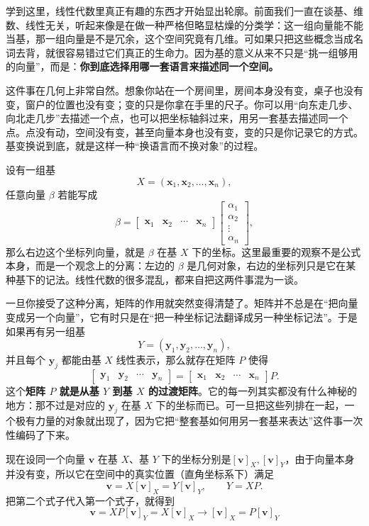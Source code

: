 \documentclass[UTF8]{ctexbook}
\begin{document}
学到这里，线性代数里真正有趣的东西才开始显出轮廓。前面我们一直在谈基、维数、线性无关，听起来像是在做一种严格但略显枯燥的分类学：这一组向量能不能当基，那一组向量是不是冗余，这个空间究竟有几维。可如果只把这些概念当成名词去背，就很容易错过它们真正的生命力。因为基的意义从来不只是“挑一组够用的向量”，而是：\textbf{你到底选择用哪一套语言来描述同一个空间。}

这件事在几何上非常自然。想象你站在一个房间里，房间本身没有变，桌子也没有变，窗户的位置也没有变；变的只是你拿在手里的尺子。你可以用“向东走几步、向北走几步”去描述一个点，也可以把坐标轴斜过来，用另一套基去描述同一个点。点没有动，空间没有变，甚至向量本身也没有变，变的只是你记录它的方式。基变换说到底，就是这样一种“换语言而不换对象”的过程。

设有一组基
\[
X=(\mathbf{x}_1,\mathbf{x}_2,\dots,\mathbf{x}_n),
\]
任意向量 $\beta$ 若能写成
\[
\beta
=\begin{bmatrix}\mathbf{x}_1 & \mathbf{x}_2 & \cdots & \mathbf{x}_n\end{bmatrix}
\begin{bmatrix}\alpha_1 \\ \alpha_2 \\ \vdots \\ \alpha_n\end{bmatrix},
\]
那么右边这个坐标列向量，就是 $\beta$ 在基 $X$ 下的坐标。这里最重要的观察不是公式本身，而是一个观念上的分离：左边的 $\beta$ 是几何对象，右边的坐标列只是它在某种基下的记法。线性代数的很多混乱，都来自把这两件事混为一谈。

一旦你接受了这种分离，矩阵的作用就突然变得清楚了。矩阵并不总是在“把向量变成另一个向量”，它有时只是在“把一种坐标记法翻译成另一种坐标记法”。于是如果再有另一组基
\[
Y=(\mathbf{y}_1,\mathbf{y}_2,\dots,\mathbf{y}_n),
\]
并且每个 $\mathbf{y}_j$ 都能由基 $X$ 线性表示，那么就存在矩阵 $P$ 使得
\[
\begin{bmatrix}
\mathbf{y}_1 & \mathbf{y}_2 & \cdots & \mathbf{y}_n
\end{bmatrix}
=
\begin{bmatrix}
\mathbf{x}_1 & \mathbf{x}_2 & \cdots & \mathbf{x}_n
\end{bmatrix}P.
\]
这个\textbf{矩阵 $P$ 就是从基 $Y$ 到基 $X$ 的过渡矩阵}。它的每一列其实都没有什么神秘的地方：那不过是对应的 $\mathbf{y}_j$ 在基 $X$ 下的坐标而已。可一旦把这些列排在一起，一个极有力量的对象就出现了，因为它把“整套基如何用另一套基来表达”这件事一次性编码了下来。

现在设同一个向量 $\mathbf{v}$ 在基 $X$、基 $Y$ 下的坐标分别是$[\mathbf{v}]_X,$$[\mathbf{v}]_Y$，由于向量本身并没有变，所以它在空间中的真实位置（直角坐标系下）满足
\[
\mathbf{v}=X[\mathbf{v}]_X=Y[\mathbf{v}]_Y,
\qquad Y=XP.
\]
把第二个式子代入第一个式子，就得到
\[
\mathbf{v}=XP[\mathbf{v}]_Y=X[\mathbf{v}]_X
\rightarrow
[\mathbf{v}]_X=P[\mathbf{v}]_Y
\]
\end{document}
